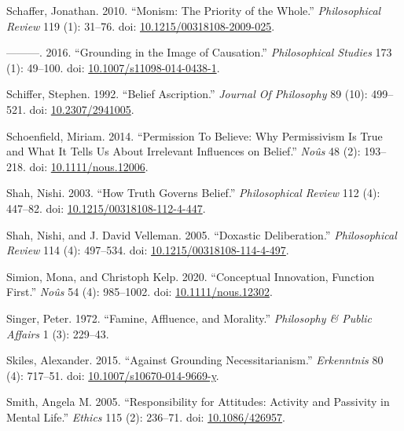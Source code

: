 \documentclass[
  10pt,
  letterpaper,
  DIV=11,
  numbers=noendperiod,
  twoside]{scrartcl}
\newlength{\cslhangindent}
\newenvironment{CSLReferences}[2] %
 {\begin{list}{}{%
  \setlength{\itemindent}{0pt}
  \setlength{\leftmargin}{0pt}
  \setlength{\parsep}{0pt}
  \ifodd #1
   \setlength{\leftmargin}{\cslhangindent}
   \setlength{\itemindent}{-1\cslhangindent}
  \fi
  \setlength{\itemsep}{#2\baselineskip}}}
 {\end{list}}
\begin{document}
\begin{CSLReferences}{1}{0}
Schaffer, Jonathan. 2010. {``Monism: The Priority of the Whole.''}
\emph{Philosophical Review} 119 (1): 31--76. doi:
\href{https://doi.org/10.1215/00318108-2009-025}{10.1215/00318108-2009-025}.

---------. 2016. {``Grounding in the Image of Causation.''}
\emph{Philosophical Studies} 173 (1): 49--100. doi:
\href{https://doi.org/10.1007/s11098-014-0438-1}{10.1007/s11098-014-0438-1}.

Schiffer, Stephen. 1992. {``Belief Ascription.''} \emph{Journal Of
Philosophy} 89 (10): 499--521. doi:
\href{https://doi.org/10.2307/2941005}{10.2307/2941005}.

Schoenfield, Miriam. 2014. {``Permission To Believe: Why Permissivism Is
True and What It Tells Us About Irrelevant Influences on Belief.''}
\emph{Noûs} 48 (2): 193--218. doi:
\href{https://doi.org/10.1111/nous.12006}{10.1111/nous.12006}.

Shah, Nishi. 2003. {``How Truth Governs Belief.''} \emph{Philosophical
Review} 112 (4): 447--82. doi:
\href{https://doi.org/10.1215/00318108-112-4-447}{10.1215/00318108-112-4-447}.

Shah, Nishi, and J. David Velleman. 2005. {``Doxastic Deliberation.''}
\emph{Philosophical Review} 114 (4): 497--534. doi:
\href{https://doi.org/10.1215/00318108-114-4-497}{10.1215/00318108-114-4-497}.

Simion, Mona, and Christoph Kelp. 2020. {``Conceptual Innovation,
Function First.''} \emph{Noûs} 54 (4): 985--1002. doi:
\href{https://doi.org/10.1111/nous.12302}{10.1111/nous.12302}.

Singer, Peter. 1972. {``Famine, Affluence, and Morality.''}
\emph{Philosophy \& Public Affairs} 1 (3): 229--43.

Skiles, Alexander. 2015. {``Against Grounding Necessitarianism.''}
\emph{Erkenntnis} 80 (4): 717--51. doi:
\href{https://doi.org/10.1007/s10670-014-9669-y}{10.1007/s10670-014-9669-y}.

Smith, Angela M. 2005. {``Responsibility for Attitudes: Activity and
Passivity in Mental Life.''} \emph{Ethics} 115 (2): 236--71. doi:
\href{https://doi.org/10.1086/426957}{10.1086/426957}.


\end{CSLReferences}
\end{document}
